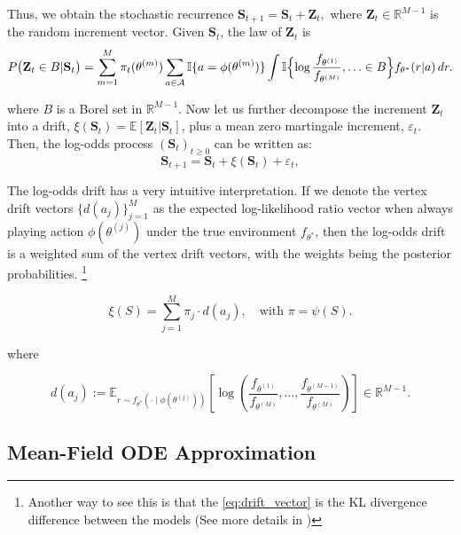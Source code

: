 \documentclass[12pt]{article}
\begin{document}
Thus, we obtain the stochastic recurrence $\mathbf{S}_{t+1} = \mathbf{S}_t + \mathbf{Z}_t,$
where $\mathbf{Z}_t\in \mathbb{R}^{M-1}$ is the random increment vector. Given $\mathbf{S}_t$, the law of $\mathbf{Z}_t$ is
\begin{equation}
P\bigl(\mathbf{Z}_t\in B | \mathbf{S}_t\bigr)
= \sum_{m=1}^M \pi_t(\theta^{(m)})
\sum_{a\in \mathcal{A}} \mathbb{I}\{a=\phi(\theta^{(m)})\}
\int
\mathbb{I}\Bigl\{
\log\frac{f_{\theta^{(1)}}}{f_{\theta^{(M)}}},\ldots
\in B
\Bigr\}
f_{\theta^*}(r|a)\,dr.
\label{eq:law-of-increment}
\end{equation}

where $B$ is a Borel set in $\mathbb{R}^{M-1}$. Now let us further decompose the increment $\mathbf{Z}_t$ into a drift, $\xi(\mathbf{S}_t) = \mathbb{E}[\mathbf{Z}_t | \mathbf{S}_t]$, plus a mean zero martingale increment, $\varepsilon_t$. Then, the log-odds process $(\mathbf{S}_t)_{t\geq 0}$ can be written as:
\begin{equation}
\mathbf{S}_{t+1} = \mathbf{S}_t + \xi(\mathbf{S}_t) + \varepsilon_t,
\label{eq:log-odds-process}
\end{equation}

The log-odds drift has a very intuitive interpretation. If we denote the vertex drift vectors $\{ d(a_j) \}_{j=1}^M$ as the expected log-likelihood ratio vector when always playing action $\phi(\theta^{(j)})$ under the true environment $f_{\theta^*}$, then the log-odds drift is a weighted sum of the vertex drift vectors, with the weights being the posterior probabilities. \footnote{Another way to see this is that the \eqref{eq:drift_vector} is the KL divergence difference between the models (See more details in \citet{frickBeliefConvergenceMisspecified2023})}

\begin{equation}
\xi(S) = \sum_{j=1}^M \pi_j \cdot d(a_j),
\quad \text{with } \pi = \psi(S).
\label{eq:drift_vector_pi}
\end{equation}

where

\begin{equation}
    d(a_j) := \mathbb{E}_{r \sim f_{\theta^*}(\cdot \mid \phi(\theta^{(j)}))} \left[ \log \left( \frac{f_{\theta^{(1)}}}{f_{\theta^{(M)}}}, \ldots, \frac{f_{\theta^{(M-1)}}}{f_{\theta^{(M)}}} \right) \right] \in \mathbb{R}^{M-1}.
    \label{eq:drift_vector_app}
\end{equation}


\subsection{Mean-Field ODE Approximation}
\label{app:A:dynamics}
\end{document}
